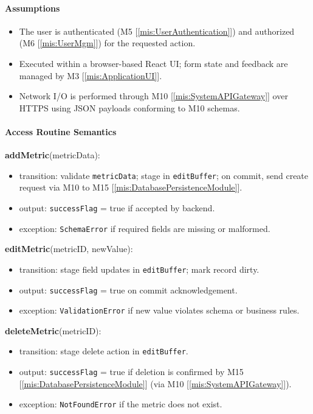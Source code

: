 \documentclass[12pt, titlepage]{article}
\begin{document}
  \paragraph{Assumptions}
  \begin{itemize}
    \item The user is authenticated (M5 [\ref{mis:UserAuthentication}]) and authorized (M6 [\ref{mis:UserMgm}]) for the requested action.
    \item Executed within a browser-based React UI; form state and feedback are managed by M3 [\ref{mis:ApplicationUI}].
    \item Network I/O is performed through M10 [\ref{mis:SystemAPIGateway}] over HTTPS using JSON payloads conforming to M10 schemas.
  \end{itemize}

  \paragraph{Access Routine Semantics}

  \noindent \textbf{addMetric}(metricData):
  \begin{itemize}
    \item transition: validate \texttt{metricData}; stage in \texttt{editBuffer}; on commit, send create request via M10 to M15 [\ref{mis:DatabasePersistenceModule}].
    \item output: \texttt{successFlag} = true if accepted by backend.
    \item exception: \texttt{SchemaError} if required fields are missing or malformed.
  \end{itemize}

  \noindent \textbf{editMetric}(metricID, newValue):
  \begin{itemize}
    \item transition: stage field updates in \texttt{editBuffer}; mark record dirty.
    \item output: \texttt{successFlag} = true on commit acknowledgement.
    \item exception: \texttt{ValidationError} if new value violates schema or business rules.
  \end{itemize}

  \noindent \textbf{deleteMetric}(metricID):
  \begin{itemize}
    \item transition: stage delete action in \texttt{editBuffer}.
    \item output: \texttt{successFlag} = true if deletion is confirmed by M15 [\ref{mis:DatabasePersistenceModule}] (via M10 [\ref{mis:SystemAPIGateway}]).
    \item exception: \texttt{NotFoundError} if the metric does not exist.
  \end{itemize}
\end{document}
